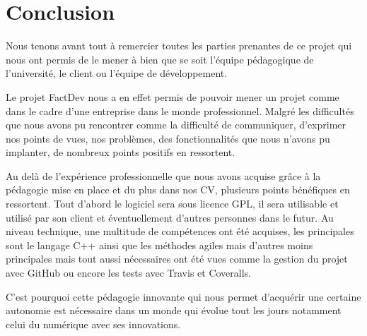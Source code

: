 \chapter*{Conclusion}
Nous tenons avant tout à remercier toutes les parties prenantes de ce projet qui nous ont permis de le mener à bien que se soit l'équipe pédagogique de l'université, le client ou l'équipe de développement. 

Le projet FactDev nous a en effet permis de pouvoir mener un projet comme dans le cadre d'une entreprise dans le monde professionnel. Malgré les difficultés que nous avons pu rencontrer comme la difficulté de communiquer, d'exprimer nos points de vues, nos problèmes, des fonctionnalités que nous n'avons pu implanter, de nombreux points positifs en ressortent. 

Au delà de l'expérience professionnelle que nous avons acquise grâce à la pédagogie mise en place et du plus dans nos CV, plusieurs points bénéfiques en ressortent.
Tout d'abord le logiciel sera sous licence GPL, il sera utilisable et utilisé par son client et éventuellement d'autres personnes dans le futur. Au niveau technique, une multitude de compétences ont été acquises, les principales sont le langage C++ ainsi que les méthodes agiles mais d'autres moins principales mais tout aussi nécessaires ont été vues comme la gestion du projet avec GitHub ou encore les tests avec Travis et Coveralls.

C'est pourquoi cette pédagogie innovante qui nous permet d'acquérir une certaine autonomie est nécessaire dans un monde qui évolue tout les jours notamment celui du numérique avec ses innovations.